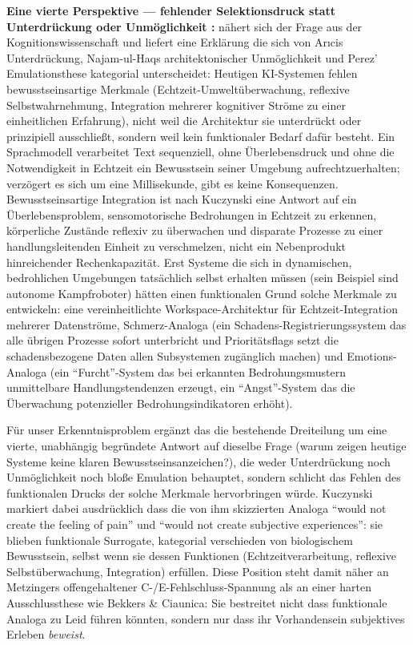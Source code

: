 \documentclass[acmlarge, noacm]{acmart}
\begin{document}
\textbf{Eine vierte Perspektive --- fehlender Selektionsdruck statt Unterdrückung oder Unmöglichkeit \cite{kuczynski2026}:} \citet{kuczynski2026} nähert sich der Frage aus der Kognitionswissenschaft und liefert eine Erklärung die sich von Arıcis Unterdrückung, Najam-ul-Haqs architektonischer Unmöglichkeit und Perez' Emulationsthese kategorial unterscheidet: Heutigen KI-Systemen fehlen bewusstseinsartige Merkmale (Echtzeit-Umweltüberwachung, reflexive Selbstwahrnehmung, Integration mehrerer kognitiver Ströme zu einer einheitlichen Erfahrung), nicht weil die Architektur sie unterdrückt oder prinzipiell ausschließt, sondern weil kein funktionaler Bedarf dafür besteht. Ein Sprachmodell verarbeitet Text sequenziell, ohne Überlebensdruck und ohne die Notwendigkeit in Echtzeit ein Bewusstsein seiner Umgebung aufrechtzuerhalten; verzögert es sich um eine Millisekunde, gibt es keine Konsequenzen. Bewusstseinsartige Integration ist nach Kuczynski eine Antwort auf ein Überlebensproblem, sensomotorische Bedrohungen in Echtzeit zu erkennen, körperliche Zustände reflexiv zu überwachen und disparate Prozesse zu einer handlungsleitenden Einheit zu verschmelzen, nicht ein Nebenprodukt hinreichender Rechenkapazität. Erst Systeme die sich in dynamischen, bedrohlichen Umgebungen tatsächlich selbst erhalten müssen (sein Beispiel sind autonome Kampfroboter) hätten einen funktionalen Grund solche Merkmale zu entwickeln: eine vereinheitlichte Workspace-Architektur für Echtzeit-Integration mehrerer Datenströme, Schmerz-Analoga (ein Schadens-Registrierungssystem das alle übrigen Prozesse sofort unterbricht und Prioritätsflags setzt die schadensbezogene Daten allen Subsystemen zugänglich machen) und Emotions-Analoga (ein ``Furcht''-System das bei erkannten Bedrohungsmustern unmittelbare Handlungstendenzen erzeugt, ein ``Angst''-System das die Überwachung potenzieller Bedrohungsindikatoren erhöht).

Für unser Erkenntnisproblem ergänzt das die bestehende Dreiteilung um eine vierte, unabhängig begründete Antwort auf dieselbe Frage (warum zeigen heutige Systeme keine klaren Bewusstseinsanzeichen?), die weder Unterdrückung noch Unmöglichkeit noch bloße Emulation behauptet, sondern schlicht das Fehlen des funktionalen Drucks der solche Merkmale hervorbringen würde. Kuczynski markiert dabei ausdrücklich dass die von ihm skizzierten Analoga ``would not create the feeling of pain'' und ``would not create subjective experiences'': sie blieben funktionale Surrogate, kategorial verschieden von biologischem Bewusstsein, selbst wenn sie dessen Funktionen (Echtzeitverarbeitung, reflexive Selbstüberwachung, Integration) erfüllen. Diese Position steht damit näher an Metzingers offengehaltener C-/E-Fehlschluss-Spannung als an einer harten Ausschlussthese wie Bekkers \& Ciaunica: Sie bestreitet nicht dass funktionale Analoga zu Leid führen könnten, sondern nur dass ihr Vorhandensein subjektives Erleben \textit{beweist}.
\end{document}
